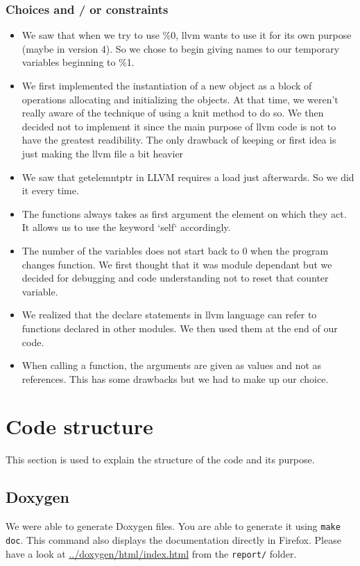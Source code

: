 \documentclass[a4paper,11pt]{article}
\begin{document}
  \subsubsection{Choices and / or constraints}
    \begin{itemize}
    \item We saw that when we try to use \%0, llvm wants to use it for its own purpose (maybe in version 4). So we chose to begin
    giving names to our temporary variables beginning to \%1.
    \item We first implemented the instantiation of a new object as a block of operations allocating and initializing the objects. 
    At that time, we weren't really aware of the technique of using a knit method to do so. We then decided not to implement it
    since the main purpose of llvm code is not to have the greatest readibility. The only drawback of keeping or first idea is just making the llvm file a bit heavier
    \item We saw that getelemntptr in LLVM requires a load just afterwards. So we did it every time.
    \item The functions always takes as first argument the element on which they act. It allows us to use the keyword `self` accordingly.
    \item The number of the variables does not start back to 0 when the program changes function.
    We first thought that it was module dependant but we decided for debugging and code understanding not to reset that counter variable.
    \item We realized that the declare statements in llvm language can refer to functions declared in other modules. We then used them at the end of our code.
    \item When calling a function, the arguments are given as values and not as references. This has some drawbacks but we had to make up our choice.
    \end{itemize}

  \section{Code structure}
    This section is used to explain the structure of the code and its purpose.

\subsection{Doxygen}
  \label{Doxygen}
  We were able to generate Doxygen files. You are able to generate it using \texttt{make doc}. This command also displays the documentation directly in Firefox.
  Please have a look at \url{../doxygen/html/index.html} from the \texttt{report/} folder.
\end{document}
